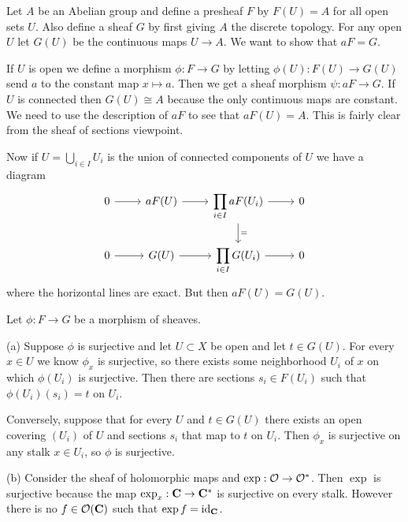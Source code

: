 \begin{e}[II.1.1]
Let $A$ be an Abelian group and define a presheaf $F$ by $F(U) = A$ for all open sets $U$.
Also define a sheaf $G$ by first giving $A$ the discrete topology.
For any open $U$ let $G(U)$ be the continuous maps $U \to A$.
We want to show that $aF = G$.

If $U$ is open we define a morphism $\phi : F \to G$ by letting $\phi(U) : F(U) \to G(U)$ send $a$ to the constant map $x \mapsto a$.
Then we get a sheaf morphism $\psi : aF \to G$.
If $U$ is connected then $G(U) \cong A$ because the only continuous maps are constant.
We need to use the description of $aF$ to see that $aF(U) = A$.
This is fairly clear from the sheaf of sections viewpoint.

Now if $U = \bigcup_{i \in I} U_i$ is the union of connected components of $U$ we have a diagram
\[
\begin{tikzcd}
0 \ar[r] &
aF(U) \ar[r] &
\displaystyle
\prod_{i \in I} aF(U_i) \ar[r] \ar[d,"="] &
\displaystyle
0
\\
0 \ar[r] &
G(U) \ar[r] &
\displaystyle
\prod_{i \in I} G(U_i) \ar[r] &
\displaystyle
0
\end{tikzcd}
\]
where the horizontal lines are exact.
But then $aF(U) = G(U)$.
\end{e}


\begin{e}[II.1.3]
Let $\phi : F \to G$ be a morphism of sheaves.

(a)
Suppose $\phi$ is surjective and let $U \subset X$ be open and let $t \in G(U)$.
For every $x \in U$ we know $\phi_x$ is surjective, so there exists some neighborhood $U_i$ of $x$ on which $\phi(U_i)$ is surjective.
Then there are sections $s_i \in F(U_i)$ such that $\phi(U_i)(s_i) = t$ on $U_i$.

Conversely, suppose that for every $U$ and $t \in G(U)$ there exists an open covering $(U_i)$ of $U$ and sections $s_i$ that map to $t$ on $U_i$.
Then $\phi_x$ is surjective on any stalk $x \in U_i$, so $\phi$ is surjective.

(b)
Consider the sheaf of holomorphic maps and $\exp : \mathcal{O} \to \mathcal{O}^*$.
Then $\exp$ is surjective because the map $\exp_x : \mathbf{C} \to \mathbf{C}^*$ is surjective on every stalk.
However there is no $f \in \mathcal{O}(\mathbf{C})$ such that $\exp f = \operatorname{id}_{\mathbf{C}}$.
\end{e}
